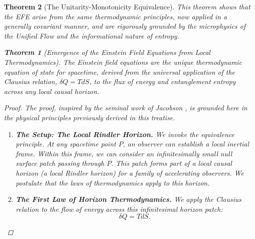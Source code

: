\documentclass[11pt, letterpaper]{report}
\theoremstyle{plain} %
\newtheorem{theorem}{Theorem}[chapter]
\theoremstyle{definition} %
\theoremstyle{remark} %
\begin{document}
\begin{theorem}[The Unitarity-Monotonicity Equivalence]
This theorem shows that the EFE arise from the same thermodynamic principles, now applied in a generally covariant manner, and are rigorously grounded by the microphysics of the Unified Flow and the informational nature of entropy.

\begin{theorem}[Emergence of the Einstein Field Equations from Local Thermodynamics]
\label{thm:verify_efe_revised}
The Einstein field equations are the unique thermodynamic equation of state for spacetime, derived from the universal application of the Clausius relation, $\delta Q = T dS$, to the flux of energy and entanglement entropy across any local causal horizon.
\end{theorem}
\begin{proof}
The proof, inspired by the seminal work of Jacobson \cite{Jacobson1995Thermodynamics}, is grounded here in the physical principles previously derived in this treatise.
\begin{enumerate}
    \item \textbf{The Setup: The Local Rindler Horizon.} We invoke the equivalence principle. At any spacetime point $P$, an observer can establish a local inertial frame. Within this frame, we can consider an infinitesimally small null surface patch passing through $P$. This patch forms part of a local causal horizon (a local Rindler horizon) for a family of accelerating observers. We postulate that the laws of thermodynamics apply to this horizon.

    \item \textbf{The First Law of Horizon Thermodynamics.} We apply the Clausius relation to the flow of energy across this infinitesimal horizon patch:
    \begin{equation}
        \delta Q = T dS.
    \end{equation}


\end{enumerate}
\end{proof}
\end{theorem}
\end{document}
